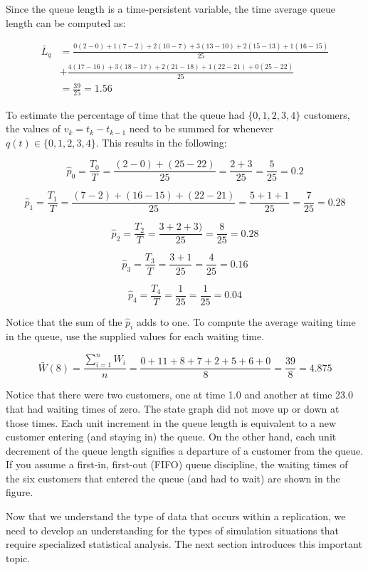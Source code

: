 \documentclass[
]{book}
\theoremstyle{definition}
\theoremstyle{definition}
\theoremstyle{definition}
\theoremstyle{definition}
\theoremstyle{remark}
\begin{document}
Since the queue length is a time-persistent variable, the time average queue length can be
computed as:

\[
\begin{aligned}
\bar{L}_q & = \frac{0(2-0) + 1(7-2) + 2(10-7) + 3(13-10) + 2(15-13) + 1(16-15)}{25}\\
 & + \frac{4(17-16) + 3(18-17) + 2(21-18) + 1(22-21) + 0(25-22)}{25} \\
 & = \frac{39}{25} = 1.56
\end{aligned}
\]

To estimate the percentage of time that the queue had
\(\lbrace 0, 1, 2, 3, 4\rbrace\) customers, the values of
\(v_k = t_k - t_{k-1}\) need to be summed for whenever
\(q(t) \in \lbrace 0, 1, 2, 3, 4 \rbrace\). This results in the following:

\[\hat{p}_0 = \dfrac{T_0}{T} = \dfrac{(2-0) + (25-22)}{25} = \dfrac{2 + 3}{25} = \dfrac{5}{25} = 0.2\]

\[\hat{p}_1 = \dfrac{T_1}{T} = \dfrac{(7-2) + (16-15) + (22-21)}{25} = \dfrac{5 + 1 + 1}{25} = \dfrac{7}{25} = 0.28\]

\[\hat{p}_2 = \dfrac{T_2}{T} = \dfrac{3 + 2 + 3)}{25} = \dfrac{8}{25} = 0.28\]

\[\hat{p}_3 = \dfrac{T_3}{T} = \dfrac{3 + 1}{25} = \dfrac{4}{25} = 0.16\]

\[\hat{p}_4 = \dfrac{T_4}{T} = \dfrac{1}{25} = \dfrac{1}{25} = 0.04\]

Notice that the sum of the \(\hat{p}_i\) adds to one. To compute the
average waiting time in the queue, use the supplied values for each
waiting time.

\[\bar{W}(8) = \frac{\sum_{i=1}^n W_i}{n} =\dfrac{0 + 11 + 8 + 7 + 2 + 5 + 6 + 0}{8} = \frac{39}{8} = 4.875\]

Notice that there were two customers, one at time 1.0 and another at
time 23.0 that had waiting times of zero. The state graph did not move
up or down at those times. Each unit increment in the queue length is
equivalent to a new customer entering (and staying in) the queue. On the
other hand, each unit decrement of the queue length signifies a
departure of a customer from the queue. If you assume a first-in,
first-out (FIFO) queue discipline, the waiting times of the six
customers that entered the queue (and had to wait) are shown in the
figure.

Now that we understand the type of data that occurs within a
replication, we need to develop an understanding for the types of
simulation situations that require specialized statistical analysis. The
next section introduces this important topic.
\end{document}
